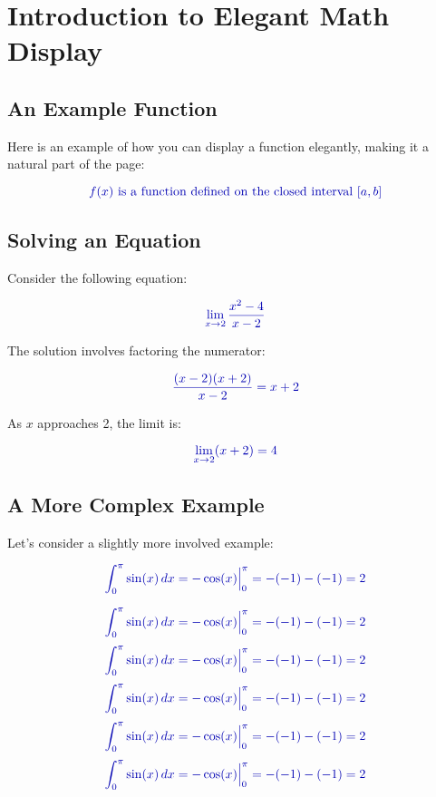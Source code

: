 \newcommand{\elegantmath}[1]{\textcolor{blue!70!black}{#1}}

\chapter{Introduction to Elegant Math Display}

\section{An Example Function}
Here is an example of how you can display a function elegantly, making it a natural part of the page:

\[
\elegantmath{f(x) \text{ is a function defined on the closed interval } [a, b]}
\]

\section{Solving an Equation}
Consider the following equation:

\[
\elegantmath{\lim_{x \to 2} \frac{x^2 - 4}{x - 2}}
\]

The solution involves factoring the numerator:

\[
\elegantmath{\frac{(x - 2)(x + 2)}{x - 2} = x + 2}
\]

As \(x\) approaches 2, the limit is:

\[
\elegantmath{\lim_{x \to 2} (x + 2) = 4}
\]

\section{A More Complex Example}
Let's consider a slightly more involved example:

\[
\elegantmath{\int_{0}^{\pi} \sin(x) \, dx = -\cos(x) \Big|_{0}^{\pi} = -(-1) - (-1) = 2}
\]

\[
\elegantmath{\int_{0}^{\pi} \sin(x) \, dx = -\cos(x) \Big|_{0}^{\pi} = -(-1) - (-1) = 2}
\]
\[
\elegantmath{\int_{0}^{\pi} \sin(x) \, dx = -\cos(x) \Big|_{0}^{\pi} = -(-1) - (-1) = 2}
\]
\[
\elegantmath{\int_{0}^{\pi} \sin(x) \, dx = -\cos(x) \Big|_{0}^{\pi} = -(-1) - (-1) = 2}
\]
\[
\elegantmath{\int_{0}^{\pi} \sin(x) \, dx = -\cos(x) \Big|_{0}^{\pi} = -(-1) - (-1) = 2}
\]
\[
\elegantmath{\int_{0}^{\pi} \sin(x) \, dx = -\cos(x) \Big|_{0}^{\pi} = -(-1) - (-1) = 2}
\]